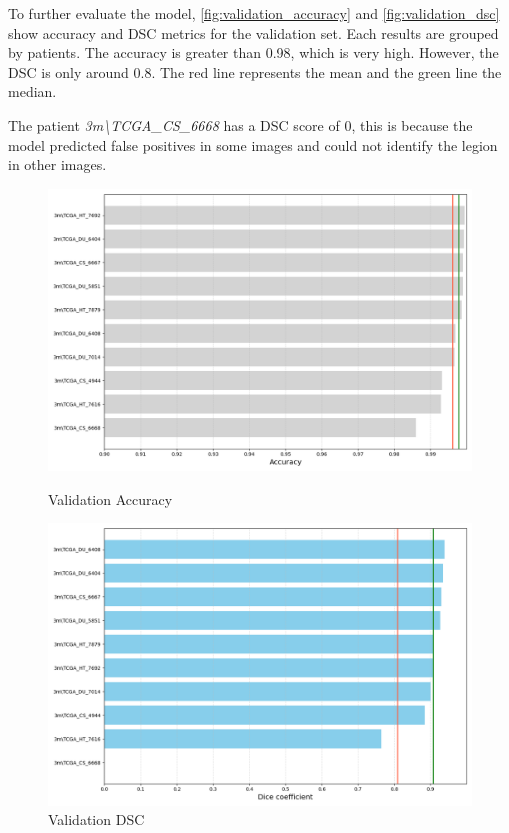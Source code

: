\documentclass[11pt,a4paper]{article}
\begin{document}
To further evaluate the model, \autoref{fig:validation_accuracy} and \autoref{fig:validation_dsc} show accuracy and DSC metrics for the validation set. Each results are grouped by patients. The accuracy is greater than 0.98, which is very high. However, the DSC is only around 0.8. The red line represents the mean and the green line the median.

The patient \textit{3m\textbackslash TCGA\_CS\_6668} has a DSC score of 0, this is because the model predicted false positives in some images and could not identify the legion in other images.
\begin{figure}[H]
    \centering
    \begin{minipage}[t]{0.48\textwidth}
        \centering
        \includegraphics[width=\linewidth]{./img/validation_accuracy_1.png}
        \caption{Validation Accuracy}
        \label{fig:validation_accuracy}
    \end{minipage}
    \hfill
    \begin{minipage}[t]{0.48\textwidth}
        \centering
        \includegraphics[width=\linewidth]{./img/validation_dsc_1.png}
        \caption{Validation DSC}
        \label{fig:validation_dsc}
    \end{minipage}
\end{figure}
\end{document}
